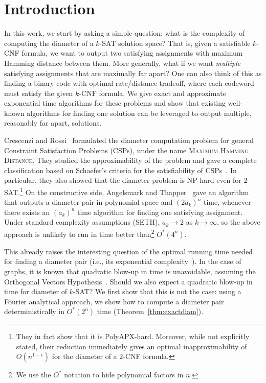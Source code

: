 \documentclass[11pt, letterpaper]{article}
\theoremstyle{definition}
\begin{document}

\section{Introduction}
\label{sec:intro}
In this work, we start by asking a simple question:  what is the complexity of computing the diameter of a $k$-SAT solution space? That is, given a satisfiable $k$-CNF formula, we want to output two satisfying assignments with maximum Hamming distance between them. More generally, what if we want \emph{multiple} satisfying assignments that are maximally far apart? One can also think of this as finding a binary code with optimal rate/distance tradeoff, where each codeword must satisfy the given $k$-CNF formula. We give exact and approximate exponential time algorithms for these problems and show that existing well-known algorithms for finding one solution can be leveraged to output multiple, reasonably far apart, solutions. 

Crescenzi and Rossi~\cite{crescenzi2002hamming} formulated the diameter computation problem for general Constraint Satisfaction Problems (CSPs), under the name \textsc{Maximum Hamming Distance}. They studied the approximability of the problem and gave a complete classification based on Schaefer’s criteria for the satisfiability of CSPs~\cite{schaefer1978complexity}. In particular, they also showed that the diameter problem is NP-hard even for $2$-SAT.\footnote{They in fact show that it is PolyAPX-hard. Moreover, while not explicitly stated, their reduction immediately gives an optimal inapproximability of $O(n^{1-\epsilon})$ for the diameter of a $2$-CNF formula.} On the constructive side, Angelsmark and Thapper~\cite{angelsmark2004algorithms} gave an algorithm that outputs a diameter pair in polynomial space and $(2a_k)^n$ time, whenever there exists an  $(a_k)^n$ time algorithm for finding one satisfying assignment. Under standard complexity assumptions (SETH), $a_{k} \rightarrow 2$ as $k \rightarrow \infty$, so the above approach is unlikely to run in time better than\footnote{We use the $O^*$ notation to hide polynomial factors in $n$.} $O^*(4^n)$.

This already raises the interesting question of the optimal running time needed for finding a diameter pair (i.e., its exponential complexity~\cite{calabro2009exponential}). In the case of graphs, it is known that quadratic blow-up in time is unavoidable, assuming the Orthogonal Vectors Hypothesis~\cite{VWill2018, alman2015probabilistic}. Should we also expect a quadratic blow-up in time for diameter of $k$-SAT? We first show that this is not the case: using a Fourier analytical approach, we show how to compute a diameter pair deterministically in $O^*(2^n)$ time (Theorem~\ref{thm:exactdiam}). 
\end{document}
